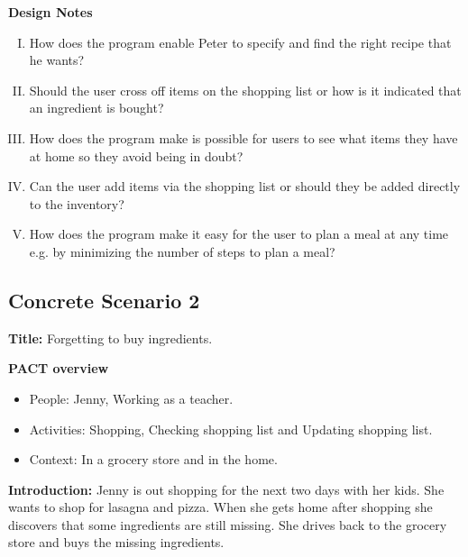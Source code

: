 \textbf{Design Notes}

\begin{enumerate} [(I)]
\item How does the program enable Peter to specify and find the right recipe that he wants?
\item Should the user cross off items on the shopping list or how is it indicated that an ingredient is bought?
\item  How does the program make is possible for users to see what items they have at home so they avoid being in doubt?
\item Can the user add items via the shopping list or should they be added directly to the inventory?
\item How does the program make it easy for the user to plan a meal at any time e.g. by minimizing the number of steps to plan a meal?
\end{enumerate}

\subsection{Concrete Scenario 2}\label{ConcreteScenario2}

\textbf{Title:} Forgetting to buy ingredients.

\textbf{PACT overview}
\begin{itemize}
\item People: Jenny, Working as a teacher.
\item Activities: Shopping, Checking shopping list and Updating shopping list. 
\item Context: In a grocery store and in the home.
\end{itemize}

\textbf{Introduction:} Jenny is out shopping for the next two days with her kids. She wants to shop for lasagna and pizza. When she gets home after shopping she discovers that some ingredients are still missing. She drives back to the grocery store and buys the missing ingredients. 

